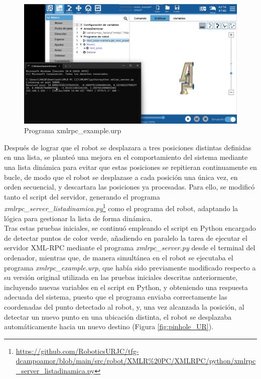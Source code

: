   \begin{figure}[H]
     \centering
     \begin{center}
       \includegraphics[width=130mm]{figs/xmlrpc_example.png}
     \end{center}
     \caption{Programa xmlrpc\_example.urp}
     \label{fig:prueba_xmlrpc}
  \end{figure}

Después de lograr que el robot se desplazara a tres posiciones distintas definidas en una lista, se planteó una mejora en el comportamiento del sistema mediante una lista dinámica para evitar que estas posiciones se repitieran continuamente en bucle, de modo que el robot se desplazase a cada posición una única vez, en orden secuencial, y descartara las posiciones ya procesadas. Para ello, se modificó tanto el script del servidor, generando el programa \textit{xmlrpc\_server\_listadinamica.py}\footnote{\url{https://github.com/RoboticsURJC/tfg-dcampoamor/blob/main/src/robot/XMLR\%20PC/XMLRPC/python/xmlrpc_server_listadinamica.py}} como el programa del robot, adaptando la lógica para gestionar la lista de forma dinámica.\\

Tras estas pruebas iniciales, se continuó empleando el script en Python encargado de detectar puntos de color verde, añadiendo en paralelo la tarea de ejecutar el servidor XML-RPC mediante el programa \textit{xmlrpc\_server.py} desde el terminal del ordenador, mientras que, de manera simultánea en el robot se ejecutaba el programa \textit{xmlrpc\_example.urp}, que había sido previamente modificado respecto a su versión original utilizada en las pruebas iniciales descritas anteriormente, incluyendo nuevas variables en el script en Python, y obteniendo una respuesta adecuada del sistema, puesto que el programa enviaba correctamente las coordenadas del punto detectado al robot, y, una vez alcanzada la posición, al detectar un nuevo punto en una ubicación distinta, el robot se desplazaba automáticamente hacia un nuevo destino (Figura \ref{fig:pinhole_UR}). 


